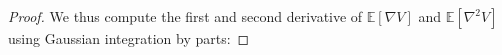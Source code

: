 \documentclass[11pt]{article}
\theoremstyle{plain}
\theoremstyle{definition}
\theoremstyle{remark}
\newcommand{\E}{\mathbb{E}}
\newcommand{\Tr}{\operatorname{Tr}}
\newcommand{\dd}{\mathrm{d}}
\begin{document}
\begin{proof}
    We thus compute the first and second derivative of $\E[\nabla V]$ and $\E[\nabla^2 V]$ using Gaussian integration by parts:

    

\end{proof}
\end{document}
